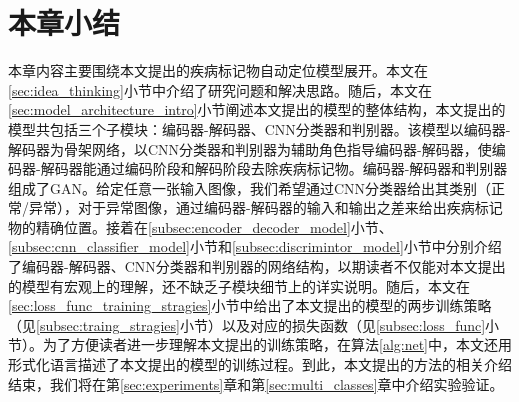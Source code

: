 \section{本章小结}\label{sec:chapter3_summary}
本章内容主要围绕本文提出的疾病标记物自动定位模型展开。本文在\ref{sec:idea_thinking}小节中介绍了研究问题和解决思路。随后，本文在\ref{sec:model_architecture_intro}小节阐述本文提出的模型的整体结构，本文提出的模型共包括三个子模块：编码器-解码器、CNN分类器和判别器。该模型以编码器-解码器为骨架网络，以CNN分类器和判别器为辅助角色指导编码器-解码器，使编码器-解码器能通过编码阶段和解码阶段去除疾病标记物。编码器-解码器和判别器组成了GAN。给定任意一张输入图像，我们希望通过CNN分类器给出其类别（正常/异常），对于异常图像，通过编码器-解码器的输入和输出之差来给出疾病标记物的精确位置。接着在\ref{subsec:encoder_decoder_model}小节、\ref{subsec:cnn_classifier_model}小节和\ref{subsec:discrimintor_model}小节中分别介绍了编码器-解码器、CNN分类器和判别器的网络结构，以期读者不仅能对本文提出的模型有宏观上的理解，还不缺乏子模块细节上的详实说明。随后，本文在\ref{sec:loss_func_training_stragies}小节中给出了本文提出的模型的两步训练策略（见\ref{subsec:traing_stragies}小节）以及对应的损失函数（见\ref{subsec:loss_func}小节）。为了方便读者进一步理解本文提出的训练策略，在算法\ref{alg:net}中，本文还用形式化语言描述了本文提出的模型的训练过程。到此，本文提出的方法的相关介绍结束，我们将在第\ref{sec:experiments}章和第\ref{sec:multi_classes}章中介绍实验验证。
